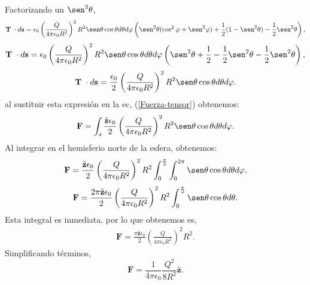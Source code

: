 \documentclass[11pt,fleqn]{book} %
\begin{document}
\begin{example}
Factorizando un $\sen^{2} \theta$,
\begin{eqnarray*}
\textbf{T}\hspace{1mm}\cdot d\textbf{s}=\epsilon_{0}\left(\frac{Q}{4 \pi \epsilon_{0}R^{2}} \right)^{2}R^{2}\sen \theta \cos \theta d\theta d\varphi\left(\sen^{2} \theta (\cos^{2} \varphi+ \sen^{2} \varphi)+\frac{1}{2}(1-\sen^{2} \theta)- \frac{1}{2}\sen^{2} \theta  \right),
\end{eqnarray*}
\begin{eqnarray*}
\textbf{T}\hspace{1mm}\cdot d\textbf{s}=\epsilon_{0}\left(\frac{Q}{4 \pi \epsilon_{0}R^{2}} \right)^{2}R^{2}\sen \theta \cos \theta d\theta d\varphi\left(\sen^{2} \theta +\frac{1}{2}-\frac{1}{2}\sen^{2} \theta - \frac{1}{2}\sen^{2} \theta  \right),
\end{eqnarray*}
\begin{equation}
\textbf{T}\hspace{1mm}\cdot d\textbf{s}=\frac{\epsilon_{0}}{2}\left(\frac{Q}{4 \pi \epsilon_{0}R^{2}} \right)^{2}R^{2}\sen \theta \cos \theta d\theta d\varphi.
\end{equation}
al sustituir esta expresi\'on en la ec, (\ref{Fuerza-tensor}) obtenemos:
\begin{eqnarray*}
\textbf{F}=\int_{s} \frac{\hat{\textbf{z}}\epsilon_{0}}{2}\left(\frac{Q}{4 \pi \epsilon_{0}R^{2}} \right)^{2}R^{2}\sen \theta \cos \theta d\theta d\varphi.
\end{eqnarray*}
Al integrar en el hemisferio norte de la esfera, obtenemos:
\begin{eqnarray*}
\textbf{F}=\frac{\hat{\textbf{z}}\epsilon_{0}}{2}\left(\frac{Q}{4 \pi \epsilon_{0}R^{2}} \right)^{2}R^{2}\int_{0}^{\frac{\pi}{2}}\int_{0}^{2\pi} \sen \theta \cos \theta d\theta d\varphi,
\end{eqnarray*}
\begin{eqnarray*}
\textbf{F}=\frac{2\pi \hat{\textbf{z}}\epsilon_{0}}{2}\left(\frac{Q}{4 \pi \epsilon_{0}R^{2}} \right)^{2}R^{2}\int_{0}^{\frac{\pi}{2}} \sen \theta \cos \theta d\theta.
\end{eqnarray*}
Esta integral es inmediata, por lo que obtenemos es,
\begin{eqnarray*}
\textbf{F}=\frac{\pi \hat{\textbf{z}}\epsilon_{0}}{2}\left(\frac{Q}{4 \pi \epsilon_{0}R^{2}} \right)^{2}R^{2}.
\end{eqnarray*}
Simplificando t\'erminos,
\begin{equation}
\textbf{F}=\frac{1}{4 \pi \epsilon_{0}} \frac{Q^{2}}{8R^{2}} \hat{\textbf{z}}.

\end{equation}
\end{example}
\end{document}
